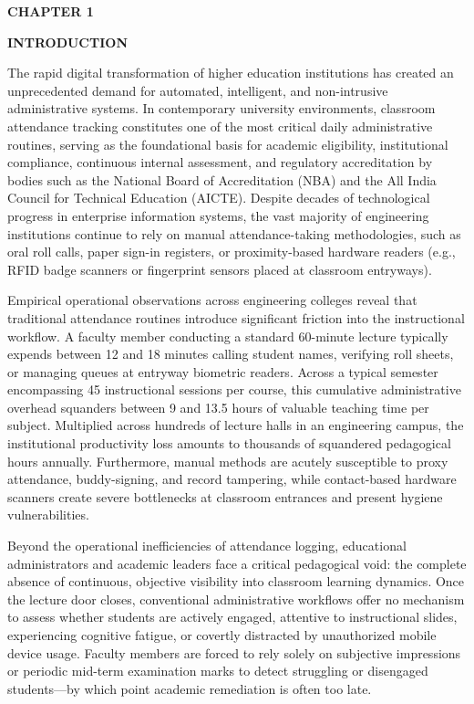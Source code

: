 \newpage
{}
\setcounter{page}{1}

\begin{flushleft}
{\fontsize{16pt}{16pt}\selectfont \textbf{CHAPTER 1}}
\end{flushleft}		
\begin{center}
{\fontsize{18pt}{22pt}\selectfont \textbf{INTRODUCTION}}\\[2mm]
\end{center}

\onehalfspacing
\justifying
\noindent The rapid digital transformation of higher education institutions has created an unprecedented demand for automated, intelligent, and non-intrusive administrative systems. In contemporary university environments, classroom attendance tracking constitutes one of the most critical daily administrative routines, serving as the foundational basis for academic eligibility, institutional compliance, continuous internal assessment, and regulatory accreditation by bodies such as the National Board of Accreditation (NBA) and the All India Council for Technical Education (AICTE). Despite decades of technological progress in enterprise information systems, the vast majority of engineering institutions continue to rely on manual attendance-taking methodologies, such as oral roll calls, paper sign-in registers, or proximity-based hardware readers (e.g., RFID badge scanners or fingerprint sensors placed at classroom entryways).

\noindent Empirical operational observations across engineering colleges reveal that traditional attendance routines introduce significant friction into the instructional workflow. A faculty member conducting a standard 60-minute lecture typically expends between 12 and 18 minutes calling student names, verifying roll sheets, or managing queues at entryway biometric readers. Across a typical semester encompassing 45 instructional sessions per course, this cumulative administrative overhead squanders between 9 and 13.5 hours of valuable teaching time per subject. Multiplied across hundreds of lecture halls in an engineering campus, the institutional productivity loss amounts to thousands of squandered pedagogical hours annually. Furthermore, manual methods are acutely susceptible to proxy attendance, buddy-signing, and record tampering, while contact-based hardware scanners create severe bottlenecks at classroom entrances and present hygiene vulnerabilities.

\noindent Beyond the operational inefficiencies of attendance logging, educational administrators and academic leaders face a critical pedagogical void: the complete absence of continuous, objective visibility into classroom learning dynamics. Once the lecture door closes, conventional administrative workflows offer no mechanism to assess whether students are actively engaged, attentive to instructional slides, experiencing cognitive fatigue, or covertly distracted by unauthorized mobile device usage. Faculty members are forced to rely solely on subjective impressions or periodic mid-term examination marks to detect struggling or disengaged students—by which point academic remediation is often too late.

